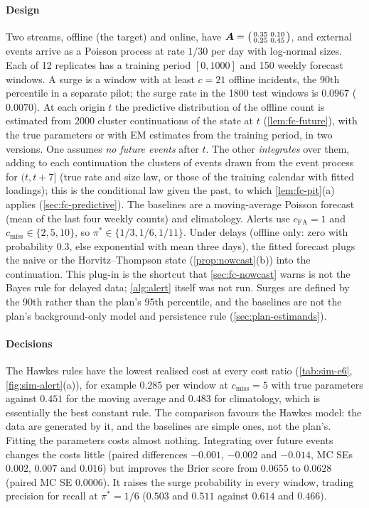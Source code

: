 \paragraph{Design} Two streams, offline (the target) and online, have
$\bm{A}=\bigl(\begin{smallmatrix}0.35&0.10\\0.25&0.45\end{smallmatrix}\bigr)$, and external
events arrive as a Poisson process at rate $1/30$ per day with log-normal sizes. Each of 12
replicates has a training period $[0,1000]$ and 150 weekly forecast windows. A surge is a window with at least $c=21$ offline
incidents, the 90th percentile in a separate pilot; the surge rate in the 1800 test windows
is $0.0967$ ($0.0070$). At each origin $t$ the predictive distribution of the offline count
is estimated from 2000 cluster continuations of the state at $t$ (\cref{lem:fc-future}),
with the true parameters or with EM estimates from the training period, in two versions.
One assumes \emph{no future events} after $t$. The other \emph{integrates} over them,
adding to each continuation the clusters of events drawn from the event process for
$(t,t+7]$ (true rate and size law, or those of the training calendar with fitted
loadings); this is the conditional law given the past, to which \cref{lem:fc-pit}(a)
applies (\cref{sec:fc-predictive}). The baselines are a moving-average Poisson forecast (mean of
the last four weekly counts) and climatology. Alerts use $c_{\mathrm{FA}}=1$ and
$c_{\mathrm{miss}}\in\{2,5,10\}$, so $\pi^*\in\{1/3,1/6,1/11\}$. Under delays
(offline only: zero with probability $0.3$, else exponential with mean three days), the
fitted forecast plugs the naive or the Horvitz--Thompson state (\cref{prop:nowcast}(b))
into the continuation. This plug-in is the shortcut that \cref{sec:fc-nowcast} warns is not
the Bayes rule for delayed data; \cref{alg:alert} itself was not run. Surges are defined by
the 90th rather than the plan's 95th percentile, and the baselines are not the plan's
background-only model and persistence rule (\cref{sec:plan-estimands}).

\paragraph{Decisions} The Hawkes rules have the lowest realised cost at every cost ratio
(\cref{tab:sim-e6}, \cref{fig:sim-alert}(a)), for example $0.285$ per window at
$c_{\mathrm{miss}}=5$ with true parameters against $0.451$ for the moving average and
$0.483$ for climatology, which is essentially the best constant rule. The comparison favours
the Hawkes model: the data are generated by it, and the baselines are simple ones, not the
plan's. Fitting the parameters costs almost nothing. Integrating over future events
changes the costs little (paired differences $-0.001$, $-0.002$ and $-0.014$, MC SEs
$0.002$, $0.007$ and $0.016$) but improves the Brier score from $0.0655$ to $0.0628$ (paired
MC SE $0.0006$). It raises the surge probability in every window, trading precision for
recall at $\pi^*=1/6$ ($0.503$ and $0.511$ against $0.614$ and $0.466$).

